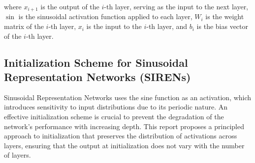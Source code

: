     where \( x_{i+1} \) is the output of the \(i\)-th layer, serving as the input to the next layer, \( \sin \) is the sinusoidal activation function applied to each layer, \( W_i \) is the weight matrix of the \(i\)-th layer, \( x_i \) is the input to the \(i\)-th layer, and \( b_i \) is the bias vector of the \(i\)-th layer.
    
    \subsection{Initialization Scheme for Sinusoidal Representation Networks (SIRENs)}
    Sinusoidal Representation Networks uses the sine function as an activation, which introduces sensitivity to input distributions due to its periodic nature. An effective initialization scheme is crucial to prevent the degradation of the network's performance with increasing depth. This report proposes a principled approach to initialization that preserves the distribution of activations across layers, ensuring that the output at initialization does not vary with the number of layers.
